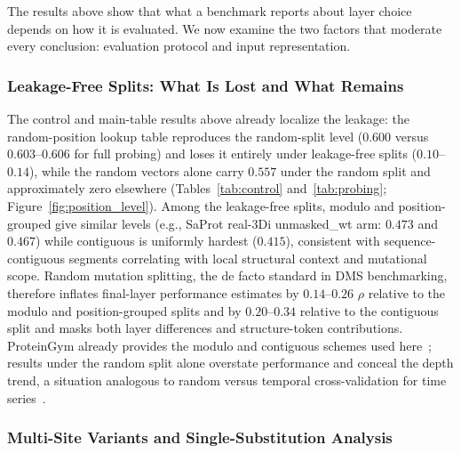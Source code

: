 \documentclass[11pt,a4paper]{article}
\newcommand{\revised}[1]{#1}
\newcommand{\rtwo}[1]{#1}
\newcommand{\rthree}[1]{#1}
\begin{document}
\rtwo{The results above show that what a benchmark reports about layer choice depends
on how it is evaluated. We now examine the two factors that moderate every
conclusion: evaluation protocol and input representation.}

\subsubsection{\revised{Leakage-Free Splits: What Is Lost and What Remains}}

\revised{The control and main-table results above already localize the leakage: the
random-position lookup table reproduces the random-split level ($0.600$ versus
$0.603$--$0.606$ for full probing) and loses it entirely under leakage-free splits
($0.10$--$0.14$), while the random vectors alone carry $0.557$ under the random
split and approximately zero elsewhere (Tables~\ref{tab:control}
and~\ref{tab:probing}; Figure~\ref{fig:position_level}). Among the leakage-free
splits, modulo and position-grouped give similar levels (e.g., SaProt real-3Di
\rthree{unmasked\_wt arm: $0.473$ and $0.467$}) while contiguous is uniformly hardest (\rthree{$0.415$}),
consistent with sequence-contiguous segments correlating with local structural
context and mutational scope. Random mutation splitting, the de facto standard in DMS
benchmarking, therefore inflates \rthree{final-layer} performance estimates by
\rthree{$0.14$--$0.26$ $\rho$ relative to the modulo and position-grouped splits and by
$0.20$--$0.34$ relative to the contiguous split} and masks both layer differences and
structure-token contributions. \rtwo{ProteinGym already provides the modulo and
contiguous schemes used here~\cite{notin2024proteingym}; results under the random split
alone overstate performance and conceal the depth trend, a situation analogous to
random versus temporal cross-validation for time series~\cite{roberts2017crossvalidation}.}}

\subsubsection{\rtwo{Multi-Site Variants \rthree{and Single-Substitution Analysis}}}
\end{document}
